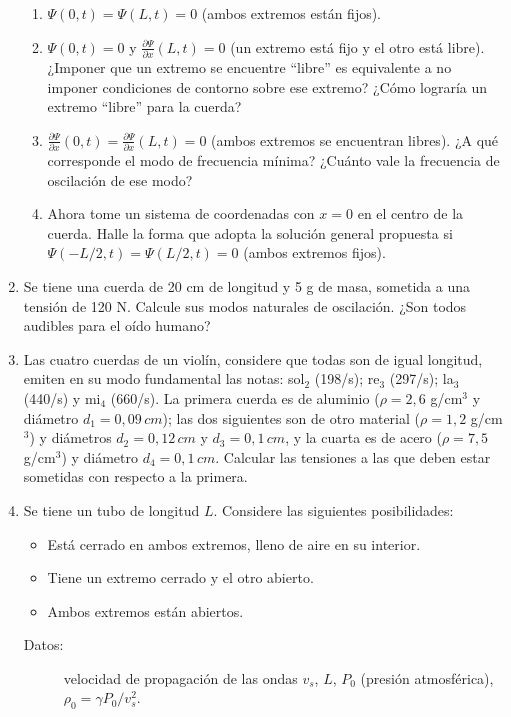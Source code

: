 \documentclass[11pt,spanish,a4paper]{article}
\begin{document}
\begin{enumerate}
\begin{enumerate}
\item $\Psi(0,t)=\Psi(L,t)=0$ (ambos extremos están fijos). 
\item $\Psi(0,t)=0$ y $\frac{\partial\Psi}{\partial x}(L,t)=0$ (un extremo
está fijo y el otro está libre). ¿Imponer que un extremo se encuentre
``libre'' es equivalente a no imponer condiciones de contorno sobre
ese extremo? ¿Cómo lograría un extremo ``libre'' para la cuerda? 
\item $\frac{\partial\Psi}{\partial x}(0,t)=\frac{\partial\Psi}{\partial x}(L,t)=0$
(ambos extremos se encuentran libres). ¿A qué corresponde el modo
de frecuencia mínima? ¿Cuánto vale la frecuencia de oscilación de
ese modo? 
\item Ahora tome un sistema de coordenadas con $x=0$ en el centro de la
cuerda. Halle la forma que adopta la solución general propuesta si
$\Psi(-L/2,t)=\Psi(L/2,t)=0$ (ambos extremos fijos).
\end{enumerate}
\item Se tiene una cuerda de 20 cm de longitud y 5 g de masa, sometida a
una tensión de 120 N. Calcule sus modos naturales de oscilación. ¿Son
todos audibles para el oído humano?
\item Las cuatro cuerdas de un violín, considere que todas son de igual
longitud, emiten en su modo fundamental las notas: sol$_{\text{2}}$
(198/s); re$_{\text{3}}$ (297/s); la$_{\text{3}}$ (440/s) y mi$_{\text{4}}$
(660/s). La primera cuerda es de aluminio ($\rho=2,6$ g/cm$^{3}$
y diámetro $d_{1}=0,09\unit{\, cm}$); las dos siguientes son de otro
material ($\rho=1,2$ g/cm$^{3}$) y diámetros $d_{2}=0,12\unit{\, cm}$
y $d_{3}=0,1\unit{\, cm}$, y la cuarta es de acero ($\rho=7,5$ g/cm$^{3}$)
y diámetro $d_{4}=0,1\unit{\, cm}$. Calcular las tensiones a las
que deben estar sometidas con respecto a la primera.
\item Se tiene un tubo de longitud $L$. Considere las siguientes posibilidades: 

\begin{itemize}
\item Está cerrado en ambos extremos, lleno de aire en su interior.
\item Tiene un extremo cerrado y el otro abierto. 
\item Ambos extremos están abiertos. \end{itemize}
\begin{description}
\item [{Datos:}] velocidad de propagación de las ondas $v_{s}$, $L$,
$P_{0}$ (presión atmosférica), $\rho_{0}=\gamma P_{0}/v_{s}^{2}$.
\end{description}


\end{enumerate}
\end{document}
